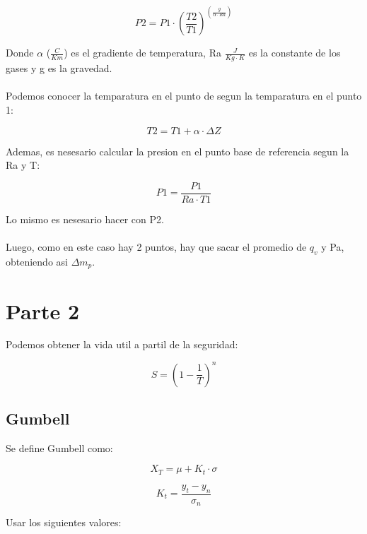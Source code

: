 \begin{equation}
    P2 = P1 \cdot (\frac{T2}{T1})^(\frac{g}{\alpha \cdot Ra})
\end{equation}

Donde $\alpha$ ($\frac{C}{Km}$) es el gradiente de temperatura, Ra $\frac{J}{Kg \cdot K}$ es la constante de los gases y g es la gravedad.
\\ \\
Podemos conocer la temparatura en el punto de segun la temparatura en el punto 1:

\begin{equation}
    T2 = T1 + \alpha \cdot \Delta Z
\end{equation}

Ademas, es nesesario calcular la presion en el punto base de referencia segun la Ra y T:

\begin{equation}
    P1 = \frac{P1}{Ra \cdot T1}
\end{equation}

Lo mismo es nesesario hacer con P2.
\\ \\
Luego, como en este caso hay 2 puntos, hay que sacar el promedio de $q_v$ y Pa, obteniendo asi $\Delta m_p$.  

\section{Parte 2}

Podemos obtener la vida util a partil de la seguridad:

\begin{equation}
    S = (1 - \frac{1}{T})^n
\end{equation}

\subsection{Gumbell}

Se define Gumbell como:

\begin{equation}
    X_T = \mu + K_t \cdot \sigma
\end{equation}

\begin{equation}
    K_t = \frac{y_t - y_n}{\sigma_n}
\end{equation}

Usar los siguientes valores:

